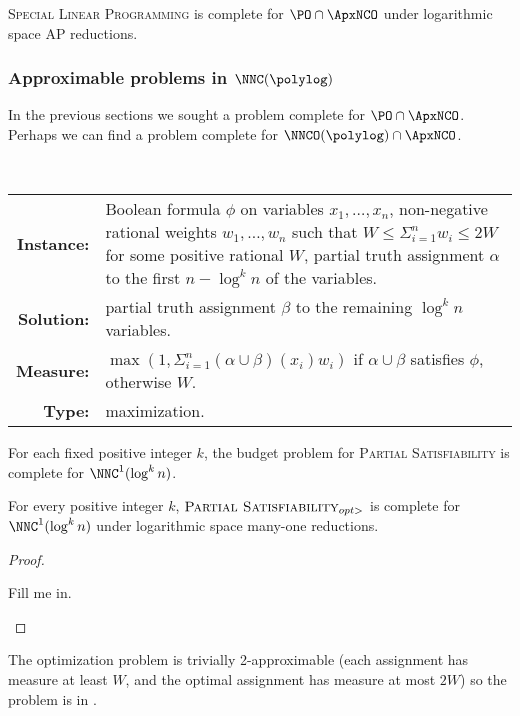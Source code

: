 \documentclass[]{article}
\begin{document}
\begin{conjecture}
  \textsc{Special Linear Programming} is complete for $\PO \cap \ApxNCO$ under logarithmic space AP reductions.
\end{conjecture}

\subsubsection{Approximable problems in \texorpdfstring{$\NNC(\polylog)$}{NNC(polylog)}}

In the previous sections we sought a problem complete for $\PO \cap \ApxNCO$.
Perhaps we can find a problem complete for $\NNCO(\polylog) \cap \ApxNCO$.

\begin{definition}
  \mbox{} \\
  \begin{tabular}{r p{9.5cm}}
    \textbf{Instance:} & Boolean formula $\phi$ on variables $x_1, \dotsc, x_n$, non-negative rational weights $w_1, \dotsc, w_n$ such that $W \leq \Sigma_{i = 1}^n w_i \leq 2W$ for some positive rational $W$, partial truth assignment $\alpha$ to the first $n - \log^k n$ of the variables. \\
    \textbf{Solution:} & partial truth assignment $\beta$ to the remaining $\log^k n$ variables. \\
    \textbf{Measure:} & $\max(1, \Sigma_{i = 1}^n (\alpha \cup \beta)(x_i) w_i)$ if $\alpha \cup \beta$ satisfies $\phi$, otherwise $W$. \\
    \textbf{Type:} & maximization.
  \end{tabular}
\end{definition}

For each fixed positive integer $k$, the budget problem for \textsc{Partial Satisfiability} is complete for $\NNC^1(\log^k n)$.

\begin{theorem}
  For every positive integer $k$, $\textsc{Partial Satisfiability}_{opt>}$ is complete for $\NNC^1(\log^k n)$ under logarithmic space many-one reductions.
\end{theorem}
\begin{proof}
  \begin{todo}
    Fill me in.
  \end{todo}
\end{proof}

The optimization problem is trivially 2-approximable (each assignment has measure at least $W$, and the optimal assignment has measure at most $2W$) so the problem is in \ApxNCO.
\end{document}
